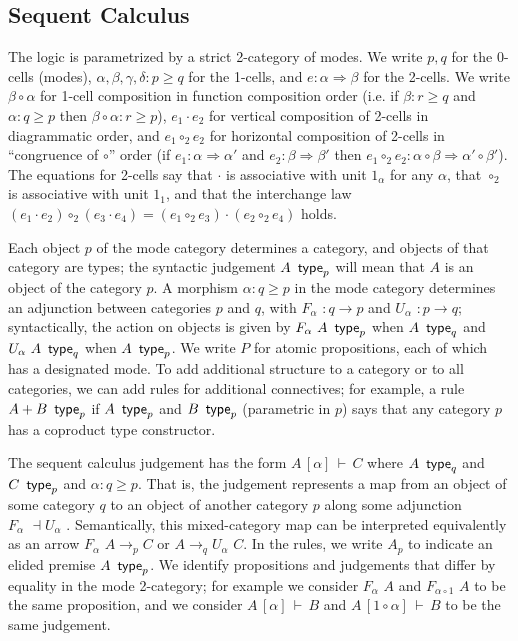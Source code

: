 \documentclass{drl-common/llncs}
\newcommand{\la}{\ensuremath{\dashv}}
\newcommand{\arrow}[3]{\ensuremath{#2 \longrightarrow_{#1} #3}}
\newcommand{\tc}[2]{\ensuremath{#1 \Rightarrow #2}}
\newcommand\compo[2]{\ensuremath{#1 \circ #2}}
\newcommand\compv[2]{\ensuremath{#1 \cdot #2}}
\newcommand\comph[2]{\ensuremath{#1 \mathbin{\circ_2} #2}}
\renewcommand\wftp[2]{\ensuremath{#1 \,\,\, \dsd{type}_{#2}}}
\newcommand\F[2]{\ensuremath{F_{#1} \,\, #2}}
\newcommand\U[2]{\ensuremath{U_{#1} \,\, #2}}
\newcommand\coprd[2]{\ensuremath{#1 + #2}}
\newcommand\seq[3]{\ensuremath{#1 \, [ #2 ] \, \vdash \, #3}}
\begin{document}
\subsection{Sequent Calculus}

The logic is parametrized by a strict 2-category of modes.  We write
$p,q$ for the 0-cells (modes), $\alpha,\beta,\gamma,\delta : p \ge q$
for the 1-cells, and $e : \tc \alpha \beta$ for the 2-cells.  We write
\compo{\beta}{\alpha} for 1-cell composition in function composition
order (i.e. if $\beta : r \ge q$ and $\alpha : q \ge p$ then
$\compo{\beta}{\alpha} : r \ge p$), \compv{e_1}{e_2} for vertical
composition of 2-cells in diagrammatic order, and \comph{e_1}{e_2} for
horizontal composition of 2-cells in ``congruence of \compo{}{}'' order
(if $e_1 : \tc \alpha {\alpha'}$ and $e_2 : \tc \beta \beta'$ then
$\comph{e_1}{e_2} :
\tc{\compo{\alpha}{\beta}}{\compo{\alpha'}{\beta'}}$).  The equations
for 2-cells say that \compv{}{} is associative with unit $1_\alpha$ for
any $\alpha$, that \comph{}{} is associative with unit $1_1$, and that
the interchange law $\comph{(\compv{e_1}{e_2})}{(\compv{e_3}{e_4})} =
\compv{(\comph{e_1}{e_3})}{(\comph{e_2}{e_4})}$ holds.  

Each object $p$ of the mode category determines a category, and objects
of that category are types; the syntactic judgement \wftp{A}{p} will
mean that $A$ is an object of the category $p$.  A morphism $\alpha : q
\ge p$ in the mode category determines an adjunction between categories
$p$ and $q$, with $\F \alpha {} : q \to p$ and $\U \alpha {} : p \to q$;
syntactically, the action on objects is given by $\wftp{\F \alpha A}{p}$
when $\wftp{A}{q}$ and $\wftp{\U \alpha A}{q}$ when $\wftp{A}{p}$.  We
write $P$ for atomic propositions, each of which has a designated mode.
To add additional structure to a category or to all categories, we can
add rules for additional connectives; for example, a rule
\wftp{\coprd{A}{B}}{p} if \wftp{A}{p} and \wftp{B}{p} (parametric in
$p$) says that any category $p$ has a coproduct type constructor.

The sequent calculus judgement has the form \seq A \alpha C where
\wftp{A}{q} and \wftp{C}{p} and $\alpha : q \ge p$.  That is, the
judgement represents a map from an object of some category $q$ to an
object of another category $p$ along some adjunction $\F \alpha {} \la
\U \alpha {}$.  Semantically, this mixed-category map can be interpreted
equivalently as an arrow \arrow{p}{\F \alpha A}{C} or \arrow{q}{A}{\U
  \alpha C}.  In the rules, we write $A_p$ to indicate an elided premise
\wftp{A}{p}.  We identify propositions and judgements that differ by
equality in the mode 2-category; for example we consider \F{\alpha}{A}
and \F{\compo{\alpha}{1}}{A} to be the same proposition, and we consider
\seq{A}{\alpha}{B} and \seq{A}{\compo{1}{\alpha}}{B} to be the same
judgement.
\end{document}
